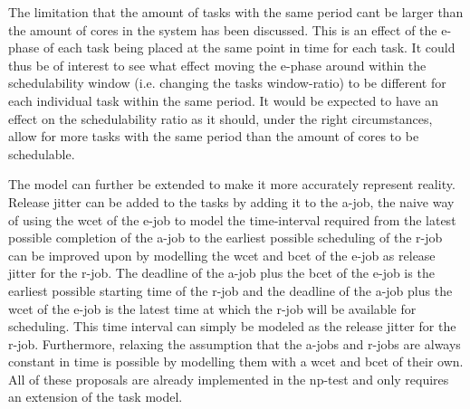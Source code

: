 \documentclass{kththesis}
\begin{document}
The limitation that the amount of tasks with the same period cant be larger than the amount of cores
in the system has been discussed. This is an effect of the \acrshort{e}-phase of each task being
placed at the same point in time for each task. It could thus be of interest to see what effect
moving the \acrshort{e}-phase around within the schedulability window (i.e. changing the tasks
window-ratio) to be different for each individual task within the same period. It would be expected
to have an effect on the schedulability ratio as it should, under the right circumstances, allow for
more tasks with the same period than the amount of cores to be schedulable.

The model can further be extended to make it more accurately represent reality. Release jitter can be
added to the tasks by adding it to the \acrshort{a}-job, the naive way of using the \acrshort{wcet}
of the \acrshort{e}-job to model the time-interval required from the latest possible completion of
the \acrshort{a}-job to the earliest possible scheduling of the \acrshort{r}-job can be improved
upon by modelling the \acrshort{wcet} and \acrshort{bcet} of the \acrshort{e}-job as release jitter
for the \acrshort{r}-job. The deadline of the \acrshort{a}-job plus the \acrshort{bcet} of the
\acrshort{e}-job is the earliest possible starting time of the \acrshort{r}-job and the deadline of
the \acrshort{a}-job plus the \acrshort{wcet} of the \acrshort{e}-job is the latest time at which
the \acrshort{r}-job will be available for scheduling. This time interval can simply be modeled as
the release jitter for the \acrshort{r}-job. Furthermore, relaxing the assumption that the
\acrshort{a}-jobs and \acrshort{r}-jobs are always constant in time is possible by modelling them
with a \acrshort{wcet} and \acrshort{bcet} of their own. All of these proposals are already
implemented in the \acrshort{np}-test and only requires an extension of the task model.


\printbibliography[heading=bibintoc] 

\appendix
\end{document}

